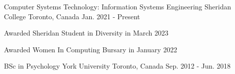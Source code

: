 \begin{cventries}
  \cventry
    {Computer Systems Technology: Information Systems Engineering}
    {Sheridan College}
    {Toronto, Canada}
    {Jan. 2021 - Present}
    {
      \begin{cvitems}
        \item {Awarded Sheridan Student in Diversity in March 2023}
        \item {Awarded Women In Computing Bursary in January 2022}
      \end{cvitems}
    }
    \cventry
    {BSc in Psychology}
    {York University}
    {Toronto, Canada}
    {Sep. 2012 - Jun. 2018}
    { }
\end{cventries}
